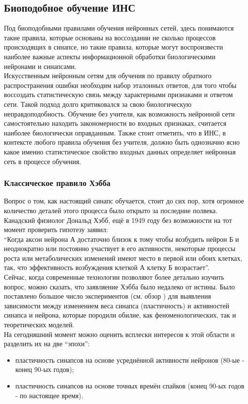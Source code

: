 \documentclass[a4paper,10pt]{article}
\begin{document}
\subsection{Биоподобное обучение ИНС}
\indent Под биоподобными правилами обучения нейронных сетей, здесь понимаются такие правила, которые основаны на воссоздании не сколько процессов происходящих в синапсе, но такие правила, которые могут воспроизвести наиболее важные аспекты информационной обработки биологическими нейронами и синапсами.\\
\indent Искусственным нейронным сетям для обучения по правилу обратного распространения ошибки необходим набор эталонных ответов, для того чтобы воссоздать статистическую связь между характерными признаками и ответом сети. Такой подход долго критиковался за свою биологическую неправдоподобность\cite{Uossermen}. Обучение без учителя, как возможность нейронной сети самостоятельно находить закономерности во входных признаках, считается наиболее биологически оправданным. Также стоит отметить, что в ИНС, в контексте любого правила обучения без учителя, должно быть однозначно ясно какое именно статистическое свойство входных данных определяет нейронная сеть в процессе обучения.\\

\subsubsection{Классическое правило Хэбба}\label{sec:hebb}
\indent Вопрос о том, как настоящий синапс обучается, стоит до сих пор, хотя огромное количество деталей этого процесса было открыто за последние полвека. Канадский физиолог Дональд Хэбб, ещё в 1949 году без возможности на тот момент проверить гипотезу заявил:\\
\indent ``Когда аксон нейрона А достаточно близок к тому чтобы возбудить нейрон Б и неоднократно или постоянно участвует в его активности, некоторые процессы роста или метаболических изменений имеют место в первой или обоих клетках, так, что эффективность возбуждения клеткой А клетку Б возрастает''\cite{Hebb1949}.\\
\indent Сейчас, когда современные технологии позволяют более детально изучить вопрос, можно сказать, что заявляение Хэбба было недалеко от истины. Было поставлено большое число экспериментов (см. обзор \cite{BiPoo}) для выявления зависимости между изменением веса синапса (пластичность) и активностей синапса и нейрона, которые породили обилие, как феноменологических, так и теоретических моделей.\\
\indent На сегодняшний момент можно оценить всплески интересов к этой области и разделить их на две ``эпохи'':
\begin{itemize}
\item пластичность синапсов на основе усреднённой активности нейронов (80-ые - конец 90-ых годов);
\item пластичность синапсов на основе точных времён спайков (конец 90-ых годов - по настоящее время).
\end{itemize}
\end{document}
